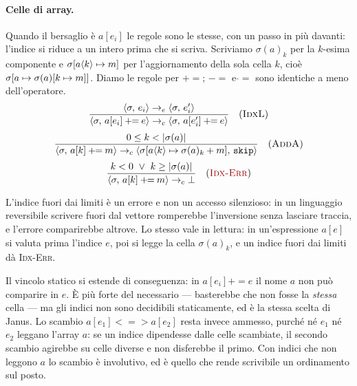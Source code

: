 \paragraph{Celle di array.} Quando il bersaglio è $a[e_i]$ le regole sono le
stesse, con un passo in più davanti: l'indice si riduce a un intero prima che
si scriva. Scriviamo $\sigma(a)_k$ per la $k$-esima componente e
$\updc{\sigma}{a}{k}{m}$ per l'aggiornamento della sola cella $k$, cioè
$\upd{\sigma}{a}{\sigma(a)[k \mapsto m]}$. Diamo le regole per
$\mathbin{+\!\!=}$; $\mathbin{-\!\!=}$ e $\mathbin{\hat{}\!=}$ sono identiche a
meno dell'operatore.
\[
\dfrac{\cfg{e_i}{\sigma} \toe \cfg{e_i'}{\sigma}}
      {\cfg{a[e_i] \mathbin{+\!\!=} e}{\sigma} \toc \cfg{a[e_i'] \mathbin{+\!\!=} e}{\sigma}} \rname{IdxL}
\]
\[
\dfrac{0 \leq k < |\sigma(a)|}
      {\cfg{a[k] \mathbin{+\!\!=} m}{\sigma} \toc \cfg{\mathtt{skip}}{\updc{\sigma}{a}{k}{\sigma(a)_k + m}}} \rname{AddA}
\]
\[
\dfrac{k < 0 \ \lor\ k \geq |\sigma(a)|}
      {\cfg{a[k] \mathbin{+\!\!=} m}{\sigma} \toc \err} \rnameerr{Idx-Err}
\]

\noindent
L'indice fuori dai limiti è un errore e non un accesso silenzioso: in un
linguaggio reversibile scrivere fuori dal vettore romperebbe l'inversione senza
lasciare traccia, e l'errore comparirebbe altrove. Lo stesso vale in lettura:
in un'espressione $a[e]$ si valuta prima l'indice $e$, poi si legge la cella
$\sigma(a)_k$, e un indice fuori dai limiti dà \textsc{Idx-Err}.

\noindent
Il vincolo statico si estende di conseguenza: in $a[e_i] \mathbin{+\!\!=} e$ il
nome $a$ non può comparire in $e$. È più forte del necessario — basterebbe che
non fosse la \emph{stessa} cella — ma gli indici non sono decidibili
staticamente, ed è la stessa scelta di Janus. Lo scambio $a[e_1]
\mathbin{<\!=\!>} a[e_2]$ resta invece ammesso, purché né $e_1$ né $e_2$
leggano l'array $a$: se un indice dipendesse dalle celle scambiate, il secondo
scambio agirebbe su celle diverse e non disferebbe il primo. Con indici che non
leggono $a$ lo scambio è involutivo, ed è quello che rende scrivibile un
ordinamento sul posto.

